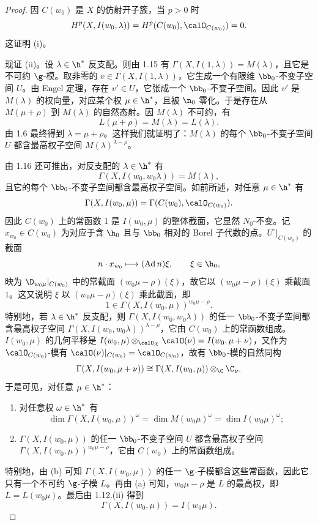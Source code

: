 \begin{proof}
因 $C(w_0)$ 是 $X$ 的仿射开子簇，当 $p>0$ 时
$$H^p(X,I(w_0,\lambda))=H^p(C(w_0),\calO_{C(w_0)})=0.$$
这证明 (i)。

现证 (ii)。设 $\lambda\in\h^*$ 反支配。则由 1.15 有 $\Gamma(X,I(1,\lambda))=M(\lambda)$，且它是不可约 $\g$-模。取非零的 $v\in\Gamma(X,I(1,\lambda))$，它生成一个有限维 $\bb_0$-不变子空间 $U$。由 Engel 定理，存在 $v'\in U$，它张成一个 $\bb_0$-不变子空间。因此 $v'$ 是 $M(\lambda)$ 的权向量，对应某个权 $\mu\in\h^*$，且被 $\n_0$ 零化。于是存在从 $M(\mu+\rho)$ 到 $M(\lambda)$ 的自然态射。因 $M(\lambda)$ 不可约，有
$$L(\mu+\rho)=M(\lambda)=L(\lambda).$$
由 1.6 最终得到 $\lambda=\mu+\rho$。这样我们就证明了：$M(\lambda)$ 的每个 $\bb_0$-不变子空间 $U$ 都含最高权子空间 $M(\lambda)^{\lambda-\rho}$。

由 1.16 还可推出，对反支配的 $\lambda\in\h^*$ 有
$$\Gamma(X,I(w_0,w_0\lambda))=M(\lambda),$$
且它的每个 $\bb_0$-不变子空间都含最高权子空间。如前所述，对任意 $\mu\in\h^*$ 有
$$\Gamma(X,I(w_0,\mu))=\Gamma(C(w_0),\calO_{C(w_0)}).$$
因此 $C(w_0)$ 上的常函数 $1$ 是 $I(w_0,\mu)$ 的整体截面，它显然 $N_0$-不变。记 $x_{w_0}\in C(w_0)$ 为对应于含 $\h_0$ 且与 $\bb_0$ 相对的 Borel 子代数的点。$U^\circ|_{C(w_0)}$ 的截面
$$n\cdot x_{w_0}\longmapsto(\operatorname{Ad} n)\xi,\qquad \xi\in\h_0,$$
映为 $\D_{w_0\mu}|_{C(w_0)}$ 中的常截面 $(w_0\mu-\rho)(\xi)$，故它以 $(w_0\mu-\rho)(\xi)$ 乘截面 $1$。这又说明 $\xi$ 以 $(w_0\mu-\rho)(\xi)$ 乘此截面，即
$$1\in\Gamma(X,I(w_0,\mu))^{w_0\mu-\rho}.$$
特别地，若 $\lambda\in\h^*$ 反支配，则 $\Gamma(X,I(w_0,w_0\lambda))$ 的任一 $\bb_0$-不变子空间都含最高权子空间 $\Gamma(X,I(w_0,w_0\lambda))^{\lambda-\rho}$，它由 $C(w_0)$ 上的常函数组成。$I(w_0,\mu)$ 的几何平移是 $I(w_0,\mu)\otimes_{\calO_X}\calO(\nu)=I(w_0,\mu+\nu)$，又作为 $\calO_{C(w_0)}$-模有 $\calO(\nu)|_{C(w_0)}=\calO_{C(w_0)}$，故有 $\bb_0$-模的自然同构
$$\Gamma(X,I(w_0,\mu+\nu))\cong\Gamma(X,I(w_0,\mu))\otimes_\C\C_\nu.$$
于是可见，对任意 $\mu\in\h^*$：
\begin{enumerate}[label=(\alph*)]
\item 对任意权 $\omega\in\h^*$ 有
$$\dim\Gamma(X,I(w_0,\mu))^\omega=\dim M(w_0\mu)^\omega=\dim I(w_0\mu)^\omega;$$
\item $\Gamma(X,I(w_0,\mu))$ 的任一 $\bb_0$-不变子空间 $U$ 都含最高权子空间 $\Gamma(X,I(w_0,\mu))^{w_0\mu-\rho}$，它由 $C(w_0)$ 上的常函数组成。
\end{enumerate}
特别地，由 (b) 可知 $\Gamma(X,I(w_0,\mu))$ 的任一 $\g$-子模都含这些常函数，因此它只有一个不可约 $\g$-子模 $L$。再由 (a) 可知，$w_0\mu-\rho$ 是 $L$ 的最高权，即 $L=L(w_0\mu)$。最后由 1.12.(ii) 得到
$$\Gamma(X,I(w_0,\mu))=I(w_0\mu).$$
\end{proof}

